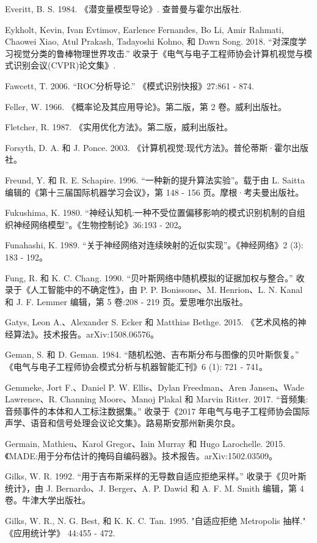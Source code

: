 \documentclass[10pt]{article}
\begin{document}
Everitt, B. S. 1984. 《潜变量模型导论》. 查普曼与霍尔出版社.

Eykholt, Kevin, Ivan Evtimov, Earlence Fernandes, Bo Li, Amir Rahmati, Chaowei Xiao, Atul Prakash, Tadayoshi Kohno, 和 Dawn Song. 2018. “对深度学习视觉分类的鲁棒物理世界攻击.” 收录于《电气与电子工程师协会计算机视觉与模式识别会议(CVPR)论文集》.

Fawcett, T. 2006. “ROC分析导论.” 《模式识别快报》27:861 - 874.

Feller, W. 1966. 《概率论及其应用导论》。第二版，第 2 卷。威利出版社。

Fletcher, R. 1987. 《实用优化方法》。第二版，威利出版社。

Forsyth, D. A. 和 J. Ponce. 2003. 《计算机视觉:现代方法》。普伦蒂斯·霍尔出版社。

Freund, Y. 和 R. E. Schapire. 1996. “一种新的提升算法实验”。载于由 L. Saitta 编辑的《第十三届国际机器学习会议》，第 148 - 156 页。摩根·考夫曼出版社。

Fukushima, K. 1980. “神经认知机:一种不受位置偏移影响的模式识别机制的自组织神经网络模型”。《生物控制论》36:193 - 202。

Funahashi, K. 1989. “关于神经网络对连续映射的近似实现”。《神经网络》2 (3): 183 - 192。

Fung, R. 和 K. C. Chang. 1990. “贝叶斯网络中随机模拟的证据加权与整合。” 收录于《人工智能中的不确定性》，由 P. P. Bonissone、M. Henrion、L. N. Kanal 和 J. F. Lemmer 编辑，第 5 卷:208 - 219 页。爱思唯尔出版社。

Gatys, Leon A.、Alexander S. Ecker 和 Matthias Bethge. 2015. 《艺术风格的神经算法》。技术报告。arXiv:1508.06576。

Geman, S. 和 D. Geman. 1984. “随机松弛、吉布斯分布与图像的贝叶斯恢复。” 《电气与电子工程师协会模式分析与机器智能汇刊》6 (1): 721 - 741。

Gemmeke, Jort F.、Daniel P. W. Ellis、Dylan Freedman、Aren Jansen、Wade Lawrence、R. Channing Moore、Manoj Plakal 和 Marvin Ritter. 2017. “音频集:音频事件的本体和人工标注数据集。” 收录于《2017 年电气与电子工程师协会国际声学、语音和信号处理会议论文集》。路易斯安那州新奥尔良。

Germain, Mathieu、Karol Gregor、Iain Murray 和 Hugo Larochelle. 2015. 《MADE:用于分布估计的掩码自编码器》。技术报告。arXiv:1502.03509。

Gilks, W. R. 1992. “用于吉布斯采样的无导数自适应拒绝采样。” 收录于《贝叶斯统计》，由 J. Bernardo、J. Berger、A. P. Dawid 和 A. F. M. Smith 编辑，第 4 卷。牛津大学出版社。

Gilks, W. R., N. G. Best, 和 K. K. C. Tan. 1995. "自适应拒绝 Metropolis 抽样." 《应用统计学》 44:455 - 472.
\end{document}
